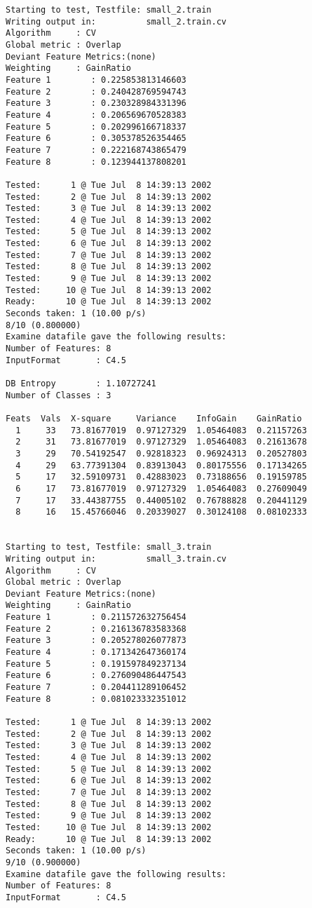 \begin{verbatim}
Starting to test, Testfile: small_2.train
Writing output in:          small_2.train.cv
Algorithm     : CV
Global metric : Overlap
Deviant Feature Metrics:(none)
Weighting     : GainRatio
Feature 1        : 0.225853813146603
Feature 2        : 0.240428769594743
Feature 3        : 0.230328984331396
Feature 4        : 0.206569670528383
Feature 5        : 0.202996166718337
Feature 6        : 0.305378526354465
Feature 7        : 0.222168743865479
Feature 8        : 0.123944137808201

Tested:      1 @ Tue Jul  8 14:39:13 2002
Tested:      2 @ Tue Jul  8 14:39:13 2002
Tested:      3 @ Tue Jul  8 14:39:13 2002
Tested:      4 @ Tue Jul  8 14:39:13 2002
Tested:      5 @ Tue Jul  8 14:39:13 2002
Tested:      6 @ Tue Jul  8 14:39:13 2002
Tested:      7 @ Tue Jul  8 14:39:13 2002
Tested:      8 @ Tue Jul  8 14:39:13 2002
Tested:      9 @ Tue Jul  8 14:39:13 2002
Tested:     10 @ Tue Jul  8 14:39:13 2002
Ready:      10 @ Tue Jul  8 14:39:13 2002
Seconds taken: 1 (10.00 p/s)
8/10 (0.800000)
Examine datafile gave the following results:
Number of Features: 8
InputFormat       : C4.5

DB Entropy        : 1.10727241
Number of Classes : 3

Feats  Vals  X-square     Variance    InfoGain    GainRatio
  1     33   73.81677019  0.97127329  1.05464083  0.21157263
  2     31   73.81677019  0.97127329  1.05464083  0.21613678
  3     29   70.54192547  0.92818323  0.96924313  0.20527803
  4     29   63.77391304  0.83913043  0.80175556  0.17134265
  5     17   32.59109731  0.42883023  0.73188656  0.19159785
  6     17   73.81677019  0.97127329  1.05464083  0.27609049
  7     17   33.44387755  0.44005102  0.76788828  0.20441129
  8     16   15.45766046  0.20339027  0.30124108  0.08102333


Starting to test, Testfile: small_3.train
Writing output in:          small_3.train.cv
Algorithm     : CV
Global metric : Overlap
Deviant Feature Metrics:(none)
Weighting     : GainRatio
Feature 1        : 0.211572632756454
Feature 2        : 0.216136783583368
Feature 3        : 0.205278026077873
Feature 4        : 0.171342647360174
Feature 5        : 0.191597849237134
Feature 6        : 0.276090486447543
Feature 7        : 0.204411289106452
Feature 8        : 0.081023332351012

Tested:      1 @ Tue Jul  8 14:39:13 2002
Tested:      2 @ Tue Jul  8 14:39:13 2002
Tested:      3 @ Tue Jul  8 14:39:13 2002
Tested:      4 @ Tue Jul  8 14:39:13 2002
Tested:      5 @ Tue Jul  8 14:39:13 2002
Tested:      6 @ Tue Jul  8 14:39:13 2002
Tested:      7 @ Tue Jul  8 14:39:13 2002
Tested:      8 @ Tue Jul  8 14:39:13 2002
Tested:      9 @ Tue Jul  8 14:39:13 2002
Tested:     10 @ Tue Jul  8 14:39:13 2002
Ready:      10 @ Tue Jul  8 14:39:13 2002
Seconds taken: 1 (10.00 p/s)
9/10 (0.900000)
Examine datafile gave the following results:
Number of Features: 8
InputFormat       : C4.5


\end{verbatim}
